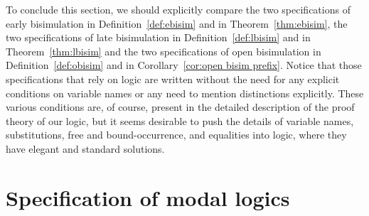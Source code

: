 \documentclass{acmtrans2m}
\begin{document}
To conclude this section, we should explicitly compare 
the two specifications of early bisimulation in Definition~\ref{def:ebisim}
and in Theorem~\ref{thm:ebisim},
the two specifications of late bisimulation in Definition~\ref{def:lbisim} and
in Theorem~\ref{thm:lbisim} and
the two specifications of open bisimulation in Definition~\ref{def:obisim}
and in Corollary~\ref{cor:open bisim prefix}.
Notice that those specifications that rely on logic are
written without the need for any explicit conditions on variable names
or any need to mention distinctions explicitly.  These various
conditions are, of course, present in the detailed description of the
proof theory of our logic, but it seems desirable to push
the details of variable names, substitutions, free and
bound-occurrence, and equalities into logic, where they have elegant
and standard solutions.


\section{Specification of modal logics}
\label{sec:modal}
\end{document}
